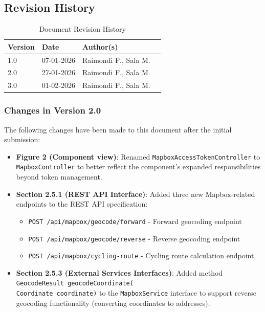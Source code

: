 \subsection{Revision History}
\begin{table}[H]
\centering
\begin{tabular}{|l|l|l|l|}
\hline
\textbf{Version} & \textbf{Date} & \textbf{Author(s)} \\
\hline
1.0 & 07-01-2026 & Raimondi F., Sala M. \\
\hline
2.0 & 27-01-2026 & Raimondi F., Sala M. \\
\hline
3.0 & 01-02-2026 & Raimondi F., Sala M. \\
\hline
\end{tabular}
\caption{Document Revision History}
\end{table}

\subsubsection{Changes in Version 2.0}
The following changes have been made to this document after the initial submission:
\begin{itemize}
    \item \textbf{Figure 2 (Component view)}: Renamed \texttt{MapboxAccessTokenController} to \texttt{MapboxController} to better reflect the component's expanded responsibilities beyond token management.
    
    \item \textbf{Section 2.5.1 (REST API Interface)}: Added three new Mapbox-related endpoints to the REST API specification:
    \begin{itemize}
        \item \texttt{POST /api/mapbox/geocode/forward} - Forward geocoding endpoint
        \item \texttt{POST /api/mapbox/geocode/reverse} - Reverse geocoding endpoint
        \item \texttt{POST /api/mapbox/cycling-route} - Cycling route calculation endpoint
    \end{itemize}
    
    \item \textbf{Section 2.5.3 (External Services Interfaces)}: Added method \texttt{GeocodeResult geocodeCoordinate(\\Coordinate coordinate)} to the \texttt{MapboxService} interface to support reverse geocoding functionality (converting coordinates to addresses).
\end{itemize}

